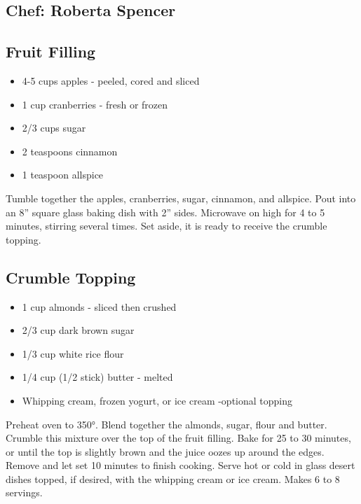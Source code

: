 \documentclass[
]{book}
\providecommand{\tightlist}{%
  \setlength{\itemsep}{0pt}\setlength{\parskip}{0pt}}
\begin{document}
\hypertarget{chef-roberta-spencer-28}{%
\subsection*{Chef: Roberta Spencer}\label{chef-roberta-spencer-28}}


\hypertarget{fruit-filling}{%
\subsection*{Fruit Filling}\label{fruit-filling}}


\begin{itemize}
\tightlist
\item
  4-5 cups apples - peeled, cored and sliced
\item
  1 cup cranberries - fresh or frozen
\item
  2/3 cups sugar
\item
  2 teaspoons cinnamon
\item
  1 teaspoon allspice
\end{itemize}

Tumble together the apples, cranberries, sugar, cinnamon, and allspice. Pout into an 8'' square glass baking dish with 2'' sides. Microwave on high for 4 to 5 minutes, stirring several times. Set aside, it is ready to receive the crumble topping.

\hypertarget{crumble-topping}{%
\subsection*{Crumble Topping}\label{crumble-topping}}


\begin{itemize}
\tightlist
\item
  1 cup almonds - sliced then crushed
\item
  2/3 cup dark brown sugar
\item
  1/3 cup white rice flour
\item
  1/4 cup (1/2 stick) butter - melted
\item
  Whipping cream, frozen yogurt, or ice cream -optional topping
\end{itemize}

Preheat oven to 350°. Blend together the almonds, sugar, flour and butter. Crumble this mixture over the top of the fruit filling. Bake for 25 to 30 minutes, or until the top is slightly brown and the juice oozes up around the edges. Remove and let set 10 minutes to finish cooking. Serve hot or cold in glass desert dishes topped, if desired, with the whipping cream or ice cream. Makes 6 to 8 servings.
\end{document}
